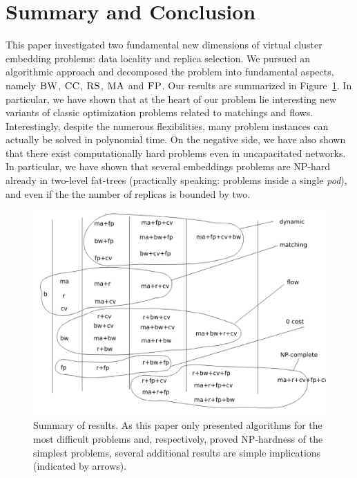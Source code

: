 \documentclass[9pt,twocolumn]{scrartcl}
\newcommand{\CC}{\textsc{CC}}
\newcommand{\FP}{\textsc{FP}}
\newcommand{\RS}{\textsc{RS}}
\newcommand{\BW}{\textsc{BW}}
\newcommand{\MA}{\textsc{MA}}
\begin{document}
\section{Summary and Conclusion}\label{sec:conclusion}

This paper investigated two fundamental new dimensions of virtual cluster
embedding problems: data locality and replica selection. We pursued
an algorithmic approach and decomposed the problem into fundamental aspects,
namely $\BW$, $\CC$, $\RS$, $\MA$ and $\FP$. Our results are summarized in
Figure~\ref{fig:summary}. 
In particular, we have shown that
at the heart of our problem lie interesting new variants of classic
optimization problems related to matchings and flows. Interestingly, despite the
numerous
flexibilities, many problem instances can actually be solved in polynomial time.
On the negative side, we have also shown that there exist computationally hard
problems even in uncapacitated networks. In particular,
we have shown that several embeddings problems are NP-hard already in two-level fat-trees (practically speaking:
problems inside a single \emph{pod}), and even if the the number of replicas is bounded by two.


\begin{figure}[t]
\includegraphics[width = \columnwidth]{figs/summary}
\caption{Summary of results. As this paper only presented algorithms for the most
difficult problems and, respectively, proved NP-hardness of the simplest
problems, several additional results are simple implications (indicated by arrows).}
\label{fig:summary}
\end{figure}
\end{document}
